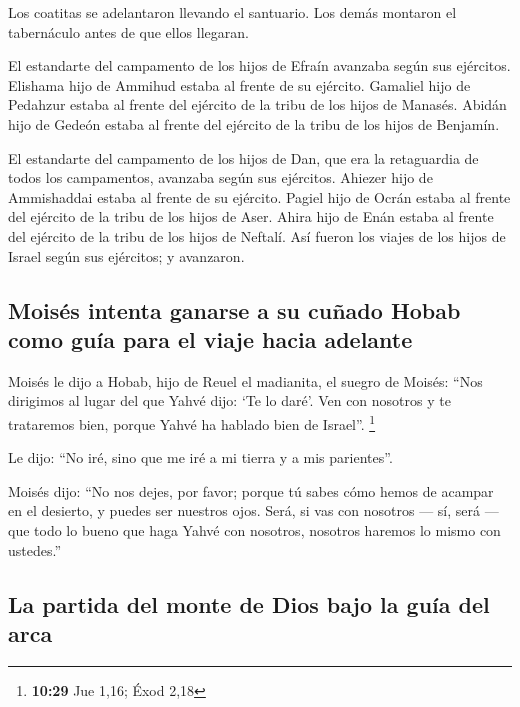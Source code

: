 \begin{paracol}{2}
 Los coatitas se adelantaron llevando el santuario. Los
demás montaron el tabernáculo antes de que ellos llegaran.

 El estandarte del campamento de los hijos de Efraín
avanzaba según sus ejércitos. Elishama hijo de Ammihud estaba al frente
de su ejército.  Gamaliel hijo de Pedahzur estaba al
frente del ejército de la tribu de los hijos de Manasés. 
Abidán hijo de Gedeón estaba al frente del ejército de la tribu de los
hijos de Benjamín.

 El estandarte del campamento de los hijos de Dan, que
era la retaguardia de todos los campamentos, avanzaba según sus
ejércitos. Ahiezer hijo de Ammishaddai estaba al frente de su ejército.
 Pagiel hijo de Ocrán estaba al frente del ejército de la
tribu de los hijos de Aser.  Ahira hijo de Enán estaba al
frente del ejército de la tribu de los hijos de Neftalí. 
Así fueron los viajes de los hijos de Israel según sus ejércitos; y
avanzaron.

\hypertarget{moisuxe9s-intenta-ganarse-a-su-cuuxf1ado-hobab-como-guuxeda-para-el-viaje-hacia-adelante}{%
\subsection{Moisés intenta ganarse a su cuñado Hobab como guía para el
viaje hacia
adelante}\label{moisuxe9s-intenta-ganarse-a-su-cuuxf1ado-hobab-como-guuxeda-para-el-viaje-hacia-adelante}}

 Moisés le dijo a Hobab, hijo de Reuel el madianita, el
suegro de Moisés: ``Nos dirigimos al lugar del que Yahvé dijo: `Te lo
daré'. Ven con nosotros y te trataremos bien, porque Yahvé ha hablado
bien de Israel''. \footnote{\textbf{10:29} Jue 1,16; Éxod 2,18}

 Le dijo: ``No iré, sino que me iré a mi tierra y a mis
parientes''.

 Moisés dijo: ``No nos dejes, por favor; porque tú sabes
cómo hemos de acampar en el desierto, y puedes ser nuestros ojos.
 Será, si vas con nosotros --- sí, será --- que todo lo
bueno que haga Yahvé con nosotros, nosotros haremos lo mismo con
ustedes.''

\hypertarget{la-partida-del-monte-de-dios-bajo-la-guuxeda-del-arca}{%
\subsection{La partida del monte de Dios bajo la guía del
arca}\label{la-partida-del-monte-de-dios-bajo-la-guuxeda-del-arca}}


\end{paracol}
